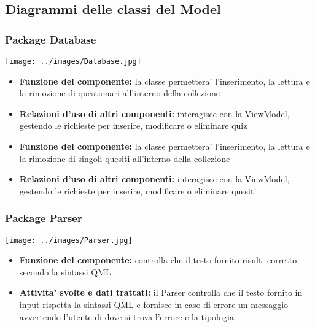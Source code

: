 \subsection{Diagrammi delle classi del Model}
			\subsubsection{Package Database}
			\begin{center}
				\texttt{[image: ../images/Database.jpg]}
			\end{center}
			\begin{itemize}
		    	\item\textbf{Funzione del componente:} la classe permettera' l'inserimento, la lettura e la rimozione di questionari all'interno della collezione
			\item\textbf{Relazioni d'uso di altri componenti:} interagisce con la ViewModel, gestendo le richieste per inserire, modificare o eliminare quiz
			\end{itemize}
			\begin{itemize}
		    	\item\textbf{Funzione del componente:} la classe permettera' l'inserimento, la lettura e la rimozione di singoli quesiti all'interno della collezione
			\item\textbf{Relazioni d'uso di altri componenti:} interagisce con la ViewModel, gestendo le richieste per inserire, modificare o eliminare quesiti
			\end{itemize}
			
			\subsubsection{Package Parser}
			\begin{center}
				\texttt{[image: ../images/Parser.jpg]}
			\end{center}
 			\begin{itemize}
		    	\item\textbf{Funzione del componente:} controlla che il testo fornito risulti corretto secondo la sintassi QML
			\item\textbf{Attivita' svolte e dati trattati:} il Parser controlla che il testo fornito in input rispetta la sintassi QML e fornisce in caso di errore un messaggio avvertendo l'utente di dove si trova l'errore e la tipologia
			\end{itemize}
			
